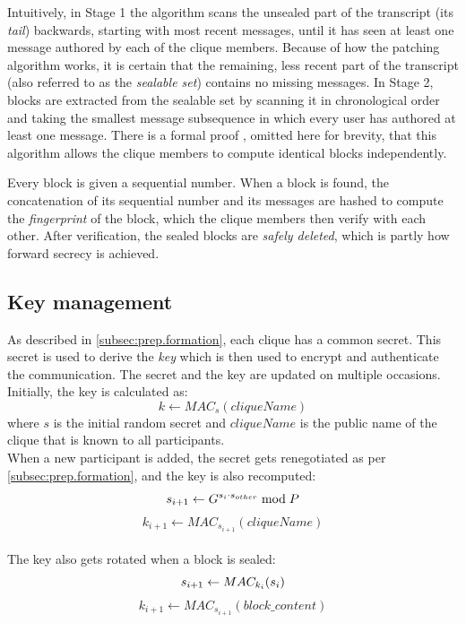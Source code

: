 \documentclass[a4paper, 12pt]{report}
\begin{document}
Intuitively, in Stage 1 the algorithm scans the unsealed part of the transcript (its \emph{tail}) backwards, starting with most recent messages, until it has seen at least one message authored by each of the clique members. Because of how the patching algorithm works, it is certain that the remaining, less recent part of the transcript (also referred to as the \emph{sealable set}) contains no missing messages. In Stage 2, blocks are extracted from the sealable set by scanning it in chronological order and taking the smallest message subsequence in which every user has authored at least one message. There is a formal proof \cite{reardon2007kleeq}, omitted here for brevity, that this algorithm allows the clique members to compute identical blocks independently.

Every block is given a sequential number. When a block is found, the concatenation of its sequential number and its messages are hashed to compute the \emph{fingerprint} of the block, which the clique members then verify with each other. After verification, the sealed blocks are \emph{safely deleted}, which is partly how forward secrecy is achieved.


\subsection{Key management}
\label{subsec:prep.keyman}
As described in \cref{subsec:prep.formation}, each clique has a common secret. This secret is used to derive the \emph{key} which is then used to encrypt and authenticate the communication. The secret and the key are updated on multiple occasions. Initially, the key is calculated as:
\begin{equation*}
    k \leftarrow MAC_{s}(cliqueName)
\end{equation*}
where $s$ is the initial random secret and $cliqueName$ is the public name of the clique that is known to all participants. \\ 

When a new participant is added, the secret gets renegotiated as per \cref{subsec:prep.formation}, and the key is also recomputed: \\
\[
    s_{i+1} \leftarrow G^{s_i \cdot s_{other}} \bmod P  \\ 
\]
\[
    k_{i+1} \leftarrow MAC_{s_{i+1}}(cliqueName)
\] \\


The key also gets rotated when a block is sealed:
\[
    s_{i+1} \leftarrow MAC_{k_i}(s_i) \\ 
\]
\[
    k_{i+1} \leftarrow MAC_{s_{i+1}}(block\_content)
\] \\
\end{document}
